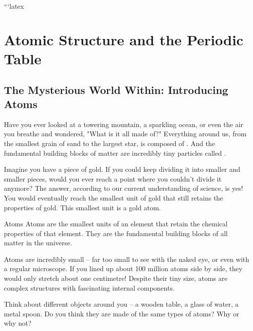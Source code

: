 ```latex
\chapter{Atomic Structure and the Periodic Table}

\section{The Mysterious World Within: Introducing Atoms}


Have you ever looked at a towering mountain, a sparkling ocean, or even the air you breathe and wondered, "What is it all made of?"  Everything around us, from the smallest grain of sand to the largest star, is composed of . And the fundamental building blocks of matter are incredibly tiny particles called .

Imagine you have a piece of gold. If you could keep dividing it into smaller and smaller pieces, would you ever reach a point where you couldn't divide it anymore?  The answer, according to our current understanding of science, is yes! You would eventually reach the smallest unit of gold that still retains the properties of gold. This smallest unit is a gold atom.

\begin{keyconcept}{Atoms}
Atoms are the smallest units of an element that retain the chemical properties of that element. They are the fundamental building blocks of all matter in the universe.
\end{keyconcept}

Atoms are incredibly small – far too small to see with the naked eye, or even with a regular microscope.  If you lined up about 100 million atoms side by side, they would only stretch about one centimetre!  Despite their tiny size, atoms are complex structures with fascinating internal components.

\begin{stopandthink}
Think about different objects around you – a wooden table, a glass of water, a metal spoon.  Do you think they are made of the same types of atoms? Why or why not?
\end{stopandthink}

